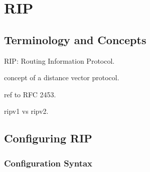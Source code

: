 \chapter{RIP}
\label{rip}
\section{Terminology and Concepts}

RIP: Routing Information Protocol.

concept of a distance vector protocol.

ref to RFC 2453.

ripv1 vs ripv2. 

\section{Configuring RIP}

\subsection{Configuration Syntax}


